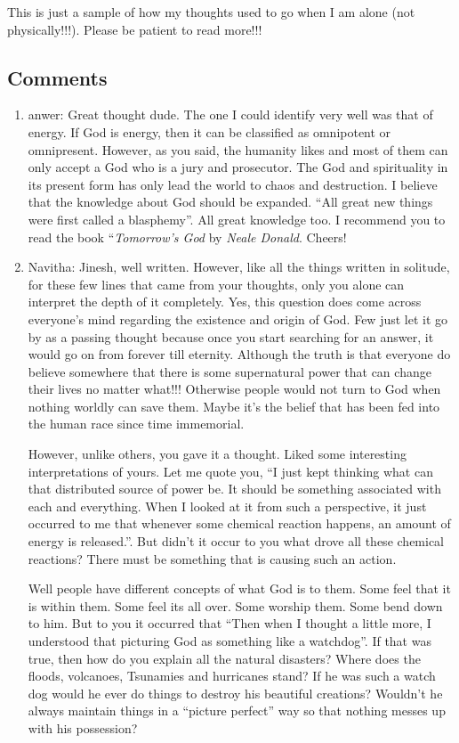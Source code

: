 {This is just a sample of how my thoughts used to go when I am alone (not physically!!!). Please be patient to read more!!!

\subsection*{Comments}
\begin{enumerate}
\item{anwer: }
Great thought dude. The one I could identify very well was that of energy. If God is energy, then it can be classified as omnipotent or omnipresent. However, as you said, the humanity likes and most of them can only accept a God who is a jury and prosecutor. The God and spirituality in its present form has only lead the world to chaos and destruction. I believe that the knowledge about God should be expanded. ``All great new things were first called a blasphemy''. All great knowledge too. I recommend you to read the book ``\emph{Tomorrow's God} by \emph{Neale Donald}. Cheers!

\item{Navitha: }
Jinesh, well written. However, like all the things written in solitude, for these few lines that came from your thoughts, only you alone can interpret the depth of it completely. Yes, this question does come across everyone's mind regarding the existence and origin of God. Few just let it go by as a passing thought because once you start searching for an answer, it would go on from forever till eternity. Although the truth is that everyone do believe somewhere that there is some supernatural power that can change their lives no matter what!!! Otherwise people would not turn to God when nothing worldly can save them. Maybe it's the belief that has been fed into the human race since time immemorial.

However, unlike others, you gave it a thought. Liked some interesting interpretations of yours.
Let me quote you, ``I just kept thinking what can that distributed source of power be. It should be something associated with each and everything. When I looked at it from such a perspective, it just occurred to me that whenever some chemical reaction happens, an amount of energy is released.''. But didn't it occur to you what drove all these chemical reactions? There must be something that is causing such an action.

Well people have different concepts of what God is to them. Some feel that it is within them. Some feel its all over. Some worship them. Some bend down to him.
But to you it occurred that “Then when I thought a little more, I understood that picturing God as something like a watchdog”. If that was true, then how do you explain all the natural disasters? Where does the floods, volcanoes, Tsunamies and hurricanes stand? If he was such a watch dog would he ever do things to destroy his beautiful creations? Wouldn't he always maintain things in a ``picture perfect'' way so that nothing messes up with his possession?



\end{enumerate}}
